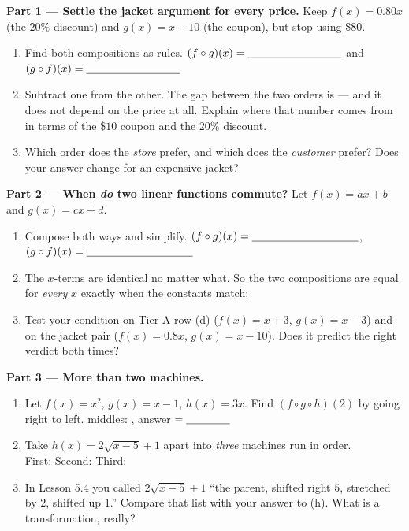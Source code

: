 \documentclass[10pt]{article}
\begin{document}
\begin{tcolorbox}[colback=white, colframe=black!40, title=\textbf{Tier E --- Extension},
    fonttitle=\bfseries, arc=1.5mm, left=3mm, right=3mm, top=2mm, bottom=2mm, breakable]
\textbf{Part 1 --- Settle the jacket argument for every price.} Keep $f(x)=0.80x$ (the $20\%$
discount) and $g(x)=x-10$ (the coupon), but stop using \$$80$.
\begin{enumerate}[label=(\alph*), leftmargin=1.9em, itemsep=6pt]
  \item Find both compositions as rules. \; $(f\circ g)(x)=\blank{3.0cm}$ \; and \;
        $(g\circ f)(x)=\blank{3.0cm}$
        \vspace{0.35in}
  \item Subtract one from the other. The gap between the two orders is \blank{2.0cm} --- and it does
        not depend on the price at all. Explain where that number comes from in terms of the
        \$$10$ coupon and the $20\%$ discount. 
  \item Which order does the \emph{store} prefer, and which does the \emph{customer} prefer? Does
        your answer change for an expensive jacket? 
\end{enumerate}

\vspace{4pt}
\textbf{Part 2 --- When \emph{do} two linear functions commute?} Let $f(x)=ax+b$ and $g(x)=cx+d$.
\begin{enumerate}[label=(\alph*), leftmargin=1.9em, itemsep=6pt, start=4]
  \item Compose both ways and simplify. \; $(f\circ g)(x)=\blank{3.4cm}$, \;
        $(g\circ f)(x)=\blank{3.4cm}$
        \vspace{0.40in}
  \item The $x$-terms are identical no matter what. So the two compositions are equal for
        \emph{every} $x$ exactly when the constants match: \blank{4.0cm}
  \item Test your condition on Tier A row (d) ($f(x)=x+3$, $g(x)=x-3$) and on the jacket pair
        ($f(x)=0.8x$, $g(x)=x-10$). Does it predict the right verdict both times? 
\end{enumerate}

\vspace{4pt}
\textbf{Part 3 --- More than two machines.}
\begin{enumerate}[label=(\alph*), leftmargin=1.9em, itemsep=6pt, start=7]
  \item Let $f(x)=x^{2}$, $g(x)=x-1$, $h(x)=3x$. Find $(f\circ g\circ h)(2)$ by going right to left.
        \; middles: \blank{1.2cm}, \blank{1.2cm} \; answer $=\blank{1.4cm}$
  \item Take $h(x)=2\sqrt{x-5}+1$ apart into \emph{three} machines run in order. \\
        First: \blank{2.6cm} \quad Second: \blank{2.6cm} \quad Third: \blank{3.0cm}
  \item In Lesson 5.4 you called $2\sqrt{x-5}+1$ ``the parent, shifted right $5$, stretched by $2$,
        shifted up $1$.'' Compare that list with your answer to (h). What is a transformation,
        really? 
\end{enumerate}


\end{tcolorbox}
\end{document}
